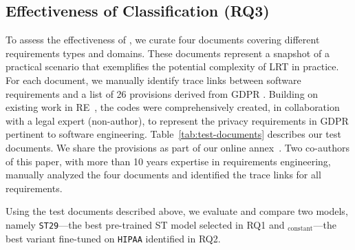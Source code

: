 
\subsection{Effectiveness of Classification (RQ3) } \label{subsec:rq3}

 To assess the effectiveness of \kashif, we curate four documents covering different requirements types and domains. These documents represent a snapshot of a practical scenario that exemplifies the potential complexity of LRT in practice. 
For each document, we manually identify trace links between software requirements and a list of 26 provisions derived from GDPR . Building on existing work in  RE~\cite{Amaral:21,Amaral:23a}, the codes were comprehensively created, in collaboration with a legal expert (non-author), to represent the privacy requirements in GDPR pertinent to software engineering. Table~\ref{tab:test-documents} describes our test documents. We share the provisions as part of our online annex~\cite{annex}. Two co-authors of this paper, with more than 10 years expertise in requirements engineering, manually analyzed the four documents and identified the trace links for all requirements. 
%





%
Using the test documents described above, we evaluate and compare two models, namely \texttt{ST29}---the best pre-trained ST model selected in RQ1  and \kashif$_{\text{constant}}$---the best \kashif variant fine-tuned on \texttt{HIPAA} identified in RQ2. 

